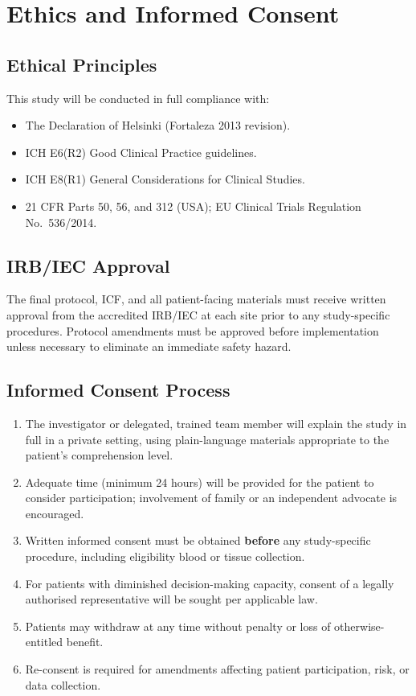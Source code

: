 \section{Ethics and Informed Consent}
\label{sec:ethics}

\subsection{Ethical Principles}

This study will be conducted in full compliance with:
\begin{itemize}
  \item The Declaration of Helsinki (Fortaleza 2013 revision).
  \item ICH E6(R2) Good Clinical Practice guidelines.
  \item ICH E8(R1) General Considerations for Clinical Studies.
  \item 21 CFR Parts 50, 56, and 312 (USA); EU Clinical Trials Regulation No.\ 536/2014.
\end{itemize}

\subsection{IRB/IEC Approval}

The final protocol, ICF, and all patient-facing materials must receive written approval from the accredited IRB/IEC at each site prior to any study-specific procedures. Protocol amendments must be approved before implementation unless necessary to eliminate an immediate safety hazard.

\subsection{Informed Consent Process}

\begin{enumerate}
  \item The investigator or delegated, trained team member will explain the study in full in a private setting, using plain-language materials appropriate to the patient's comprehension level.
  \item Adequate time (minimum 24 hours) will be provided for the patient to consider participation; involvement of family or an independent advocate is encouraged.
  \item Written informed consent must be obtained \textbf{before} any study-specific procedure, including eligibility blood or tissue collection.
  \item For patients with diminished decision-making capacity, consent of a legally authorised representative will be sought per applicable law.
  \item Patients may withdraw at any time without penalty or loss of otherwise-entitled benefit.
  \item Re-consent is required for amendments affecting patient participation, risk, or data collection.
\end{enumerate}

